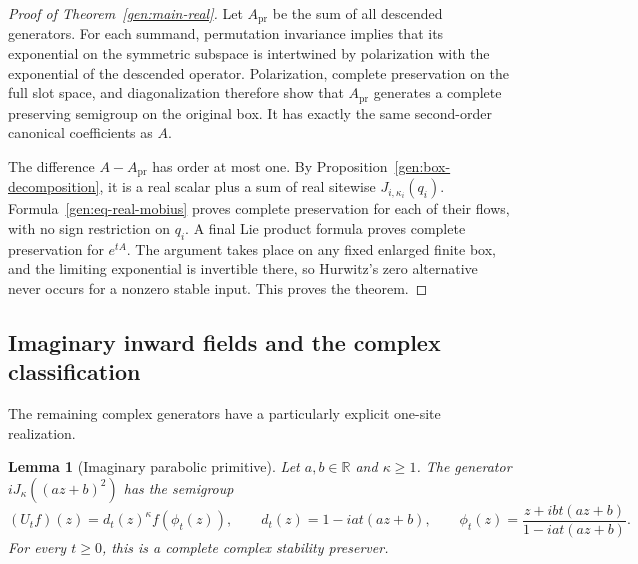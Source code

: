 \documentclass[reqno]{amsart}
\newtheorem{lemma}[theorem]{Lemma}
\theoremstyle{definition}
\theoremstyle{remark}
\newcommand{\R}{\mathbb R}
\begin{document}
\begin{proof}[Proof of Theorem~\ref{gen:main-real}]
Let \(A_{\mathrm{pr}}\) be the sum of all descended generators.
For each summand, permutation invariance implies that its
exponential on the symmetric subspace is intertwined by
polarization with the exponential of the descended operator.
Polarization, complete preservation on the full slot space,
and diagonalization therefore show that \(A_{\mathrm{pr}}\)
generates a complete preserving semigroup on the original box.
It has exactly the same second-order canonical coefficients as
\(A\).

The difference \(A-A_{\mathrm{pr}}\) has order at most one.
By Proposition~\ref{gen:box-decomposition}, it is a real scalar
plus a sum of real sitewise \(J_{i,\kappa_i}(q_i)\).
Formula~\eqref{gen:eq-real-mobius} proves complete preservation
for each of their flows, with no sign restriction on \(q_i\).
A final Lie product formula proves complete preservation for
\(e^{tA}\).
The argument takes place on any fixed enlarged finite box,
and the limiting exponential is invertible there, so Hurwitz's
zero alternative never occurs for a nonzero stable input.
This proves the theorem.
\end{proof}

\subsection{Imaginary inward fields and the complex classification}
\label{gen:subsec-complex-proof}

The remaining complex generators have a particularly explicit
one-site realization.

\begin{lemma}[Imaginary parabolic primitive]
\label{gen:imaginary-primitive}
Let \(a,b\in\R\) and \(\kappa\geq1\).
The generator \(iJ_\kappa((az+b)^2)\) has the semigroup
\begin{equation}
 (U_tf)(z)=d_t(z)^\kappa f(\phi_t(z)),\qquad
 d_t(z)=1-iat(az+b),\qquad
 \phi_t(z)=\frac{z+ibt(az+b)}{1-iat(az+b)}.
 \label{gen:eq-imaginary-flow}
\end{equation}
For every \(t\geq0\), this is a complete complex stability preserver.
\end{lemma}
\end{document}
